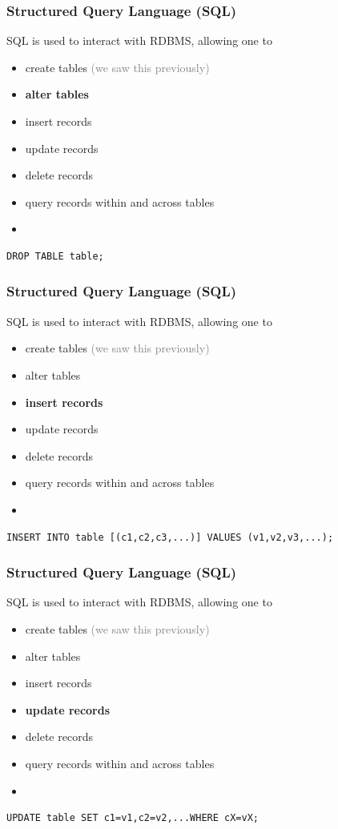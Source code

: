 \documentclass[xcolor={dvipsnames}]{beamer}
\begin{document}
\begin{frame}[fragile]\frametitle{Structured Query Language (SQL)}
SQL is used to interact with RDBMS, allowing one to 
\begin{itemize}
\item create tables \textcolor{gray}{(we saw this previously)}
\item \textbf{alter tables}
\item insert records
\item update records
\item delete records
\item query records within and across tables
\item[]
\end{itemize}

\begin{verbatim}
DROP TABLE table;
\end{verbatim}
\end{frame}

\begin{frame}[fragile]\frametitle{Structured Query Language (SQL)}
SQL is used to interact with RDBMS, allowing one to 
\begin{itemize}
\item create tables \textcolor{gray}{(we saw this previously)}
\item alter tables
\item \textbf{insert records}
\item update records
\item delete records
\item query records within and across tables
\item[]
\end{itemize}

\begin{verbatim}
INSERT INTO table [(c1,c2,c3,...)] VALUES (v1,v2,v3,...);
\end{verbatim}
\end{frame}

\begin{frame}[fragile]\frametitle{Structured Query Language (SQL)}
SQL is used to interact with RDBMS, allowing one to 
\begin{itemize}
\item create tables \textcolor{gray}{(we saw this previously)}
\item alter tables
\item insert records
\item \textbf{update records}
\item delete records
\item query records within and across tables
\item[]
\end{itemize}

\begin{verbatim}
UPDATE table SET c1=v1,c2=v2,...WHERE cX=vX;
\end{verbatim}
\end{frame}
\end{document}
